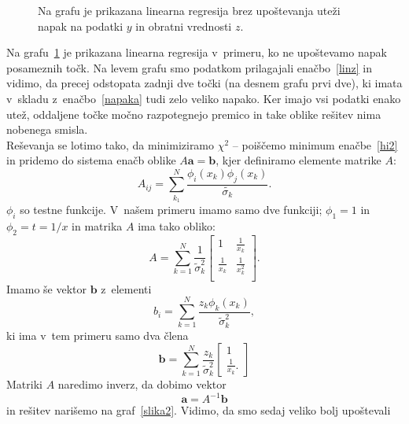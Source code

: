 \documentclass[a4paper,pdftex,12pt]{article}
\renewcommand{\vec}[1]{\boldsymbol{\mathbf{#1}}}
\numberwithin{figure}{section} %
\begin{document}
 \begin{figure}    
    \resizebox{0.98\linewidth}{!}{}
    \caption{Na grafu je prikazana linearna regresija brez upoštevanja uteži napak na
     podatki $y$ in obratni vrednosti $z$.}
    \label{slika1}
\end{figure}
Na grafu~\ref{slika1} je prikazana linearna regresija v~primeru, ko ne upoštevamo napak
posameznih točk. Na levem grafu smo podatkom prilagajali enačbo~\ref{linz} in vidimo,
da precej odstopata zadnji dve točki (na desnem grafu prvi dve), ki imata v~skladu 
z~enačbo~\ref{napaka} tudi zelo veliko napako. Ker imajo vsi podatki enako utež, oddaljene
točke močno razpotegnejo premico in take oblike rešitev nima nobenega smisla.\\
Reševanja se lotimo tako, da minimiziramo $\chi^2$ -- poiščemo minimum enačbe~\ref{hi2} 
in pridemo do sistema enačb oblike $A\vec{a}=\vec{b}$, kjer definiramo elemente matrike $A$:
\begin{equation}
    A_{ij} = \sum_{k_1}^N \frac{\phi_i(x_k) \phi_j(x_k)}{\widetilde{\sigma_k}}.
\end{equation}
$\phi_i$ so testne funkcije. V~našem primeru imamo samo dve funkciji; $\phi_1=1$ in
$\phi_2 = t = 1/x$ in matrika $A$ ima tako obliko:
\begin{equation}
    A =  \sum_{k=1}^N \frac{1}{\widetilde{\sigma}^2_k}
    \begin{bmatrix}
	1 & \frac{1}{x_k} \\
	\frac{1}{x_k} & \frac{1}{x_k^2} \\
    \end{bmatrix}.
\end{equation}
Imamo še vektor $\vec{b}$ z~elementi
\begin{equation}
    b_i =  \sum_{k=1}^N \frac{z_k \phi_k(x_k)}{\widetilde{\sigma}^2_k},
\end{equation}
ki ima v~tem primeru samo dva člena
\begin{equation}
    \vec{b} = \sum_{k=1}^N \frac{z_k}{\widetilde{\sigma}^2_k}
    \begin{bmatrix}
	1 \\ \frac{1}{x_k}.
    \end{bmatrix}
\end{equation}
Matriki $A$ naredimo inverz, da dobimo vektor
\begin{equation}
    \vec{a} = A^{-1}\vec{b}
\end{equation}
in rešitev narišemo na graf~\ref{slika2}. Vidimo, da smo sedaj veliko bolj upoštevali 
\end{document}
